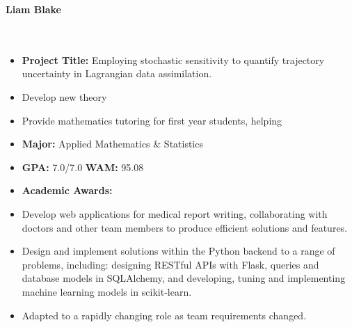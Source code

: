 \documentclass[11pt,a4paper,academicons]{altacv}
\begin{document}

\begin{fullwidth}

	\begin{center}
		\color{emphasis}%
		{\fontsize{48pt}{48pt}\selectfont\bfseries{Liam Blake}}\\[0.25ex]

		\small {} \
		 \\[0.1ex]
		 \
	\end{center}
	\divider

\end{fullwidth}

\begin{itemize}
	\item \textbf{Project Title:} Employing stochastic sensitivity to quantify trajectory uncertainty in Lagrangian data assimilation.
 
	\item Develop new theory 

	\item Provide mathematics tutoring for first year students, helping 
\end{itemize}

\begin{itemize}
	\item \textbf{Major:} Applied Mathematics \& Statistics

	\item \textbf{GPA:} 7.0/7.0 \qquad \textbf{WAM:} 95.08

	\item \textbf{Academic Awards:}
\end{itemize}

\divider


\begin{itemize}
	\item Develop web applications for medical report writing, collaborating with doctors and other team members to produce efficient solutions and features.

	\item Design and implement solutions within the Python backend to a range of problems, including: designing RESTful APIs with Flask, queries and database models in SQLAlchemy, and developing, tuning and implementing machine learning models in scikit-learn.

	\item Adapted to a rapidly changing role as team requirements changed.

\end{itemize}
\end{document}
